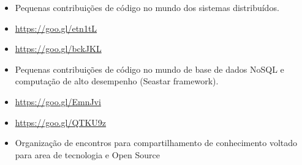 \documentclass[10pt,a4paper]{altacv}
\begin{document}

\begin{itemize}
\item Pequenas contribuições de código no mundo dos sistemas distribuídos.
\item \href{https://goo.gl/etn1tL}{https://goo.gl/etn1tL}
\end{itemize}


\begin{itemize}
\item \href{https://goo.gl/bckJKL}{https://goo.gl/bckJKL}
\end{itemize}

\begin{itemize}
\item Pequenas contribuições de código no mundo de base de dados NoSQL e computação de alto desempenho (Seastar framework).
\item \href{https://goo.gl/EmnJvi}{https://goo.gl/EmnJvi}
\item \href{https://goo.gl/QTKU9z}{https://goo.gl/QTKU9z}
\end{itemize}


\begin{itemize}
\item Organização de encontros para compartilhamento de conhecimento voltado para area de tecnologia e Open Source
\end{itemize}

\clearpage
\end{document}
